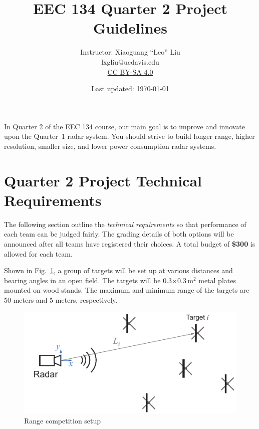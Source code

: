 \documentclass[letterpaper, 11pt]{article}
\begin{document}
\title{EEC 134 Quarter 2 Project Guidelines}
\author{Instructor: Xiaoguang ``Leo'' Liu\\lxgliu@ucdavis.edu \\
	\small \href{http://creativecommons.org/licenses/by-sa/4.0/}{CC BY-SA 4.0}}
\date{Last updated: \today}

\maketitle

In Quarter 2 of the EEC 134 course, our main goal is to improve and innovate upon the Quarter~1 radar system. You should strive to build longer range, higher resolution, smaller size, and lower power consumption radar systems.

\section{Quarter 2 Project Technical Requirements}

The following section outline the \textit{technical requirements} so that performance of each team can be judged fairly. The grading details of both options will be announced after all teams have registered their choices. A total budget of \textbf{\$300} is allowed for each team. 

	

Shown in Fig.~\ref{fig:range-competition}, a group of targets will be set up at various distances and bearing angles in an open field. The targets will be 0.3$\times$0.3\,m$^2$ metal plates mounted on wood stands. The maximum and minimum range of the targets are 50 meters and 5 meters, respectively. 

	\begin{figure}[h]
		\centering
		\includegraphics{range-competition}
		\caption{Range competition setup}
		\label{fig:range-competition}
	\end{figure}
\end{document}
